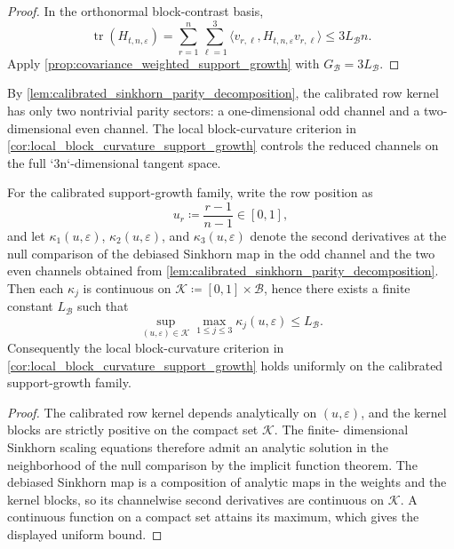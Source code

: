 \begin{proof}
In the orthonormal block-contrast basis,
\[
  \operatorname{tr}(H_{t,n,\varepsilon})
  = \sum_{r=1}^n \sum_{\ell=1}^3
  \langle v_{r,\ell}, H_{t,n,\varepsilon} v_{r,\ell}\rangle
  \le 3L_{\mathcal B} n.
\]
Apply \cref{prop:covariance_weighted_support_growth} with
$G_{\mathcal B}=3L_{\mathcal B}$.
\end{proof}

\begin{remark}
\label{rem:calibrated_support_growth_channels}
By \cref{lem:calibrated_sinkhorn_parity_decomposition}, the calibrated row
kernel has only two nontrivial parity sectors: a one-dimensional odd channel and
a two-dimensional even channel. The local block-curvature criterion in
\cref{cor:local_block_curvature_support_growth} controls the reduced channels on
the full `3n`-dimensional tangent space.
\end{remark}

\begin{proposition}
\label{prop:uniform_parity_channel_curvature}
For the calibrated support-growth family, write the row position as
\[
  u_r \coloneqq \frac{r-1}{n-1}\in[0,1],
\]
and let $\kappa_1(u,\varepsilon)$, $\kappa_2(u,\varepsilon)$, and
$\kappa_3(u,\varepsilon)$ denote the second derivatives at the null comparison
of the debiased Sinkhorn map in the odd channel and the two even channels
obtained from \cref{lem:calibrated_sinkhorn_parity_decomposition}. Then each
$\kappa_j$ is continuous on $\mathcal K \coloneqq [0,1]\times\mathcal B$, hence
there exists a finite constant $L_{\mathcal B}$ such that
\[
  \sup_{(u,\varepsilon)\in\mathcal K} \max_{1\le j\le 3}
  \kappa_j(u,\varepsilon)
  \le L_{\mathcal B}.
\]
Consequently the local block-curvature criterion in
\cref{cor:local_block_curvature_support_growth} holds uniformly on the calibrated
support-growth family.
\end{proposition}

\begin{proof}
The calibrated row kernel depends analytically on $(u,\varepsilon)$, and the
kernel blocks are strictly positive on the compact set $\mathcal K$. The finite-
dimensional Sinkhorn scaling equations therefore admit an analytic solution in
the neighborhood of the null comparison by the implicit function theorem. The
debiased Sinkhorn map is a composition of analytic maps in the weights and the
kernel blocks, so its channelwise second derivatives are continuous on
$\mathcal K$. A continuous function on a compact set attains its maximum, which
gives the displayed uniform bound.
\end{proof}

